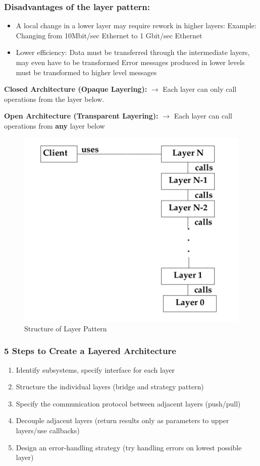 \subsubsection*{Disadvantages of the layer pattern:}
\begin{itemize}
	\item A local change in a lower layer may require rework in higher layers:
	\subitem Example: Changing from 10Mbit/sec Ethernet to 1 Gbit/sec Ethernet
	\item Lower efficiency:
		\subitem Data must be transferred through the intermediate layers, may even have to be
	 transformed
		\subitem Error messages produced in lower levels must be transformed to higher level messages
\end{itemize}

\begin{description}
	\item \textbf{Closed Architecture (Opaque Layering):}
		\subitem $\rightarrow$ Each layer can only call operations from the layer below.
	\item \textbf{Open Architecture (Transparent Layering):}
		\subitem $\rightarrow$ Each layer can call operations from \textbf{any} layer below
\end{description}
\newpage

\begin{figure}[h]
	\centering
	\includegraphics[width=0.6\linewidth]{images/pattern_layer.png}
	\caption{Structure of Layer Pattern}
\end{figure}

\subsubsection*{5 Steps to Create a Layered Architecture}
\begin{enumerate}
  \item Identify subsystems, specify interface for each layer
  \item Structure the individual layers (bridge and strategy pattern)
  \item Specify the communication protocol between adjacent layers (push/pull)
  \item Decouple adjacent layers (return results only as parameters to upper layers/use callbacks)
  \item Design an error-handling strategy (try handling errors on lowest possible layer)
\end{enumerate}
\newpage


